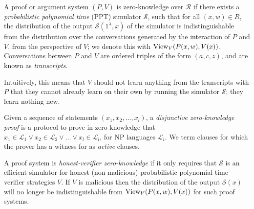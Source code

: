 \begin{definition}
A proof or argument system $(P,V)$ is zero-knowledge over $\mathcal R$ if there exists a \textit{probabilistic polynomial time} (PPT) simulator $\mathcal S$, such that for all $(x,w) \in R$, the distribution of the output $\mathcal S(1^\lambda, x)$ of the simulator is indistinguishable from the distribution over the conversations generated by the interaction of $P$ and $V$, from the perspective of $V$; we denote this with $\text{View}_V(P(x,w),V(x))$. Conversations between $P$ and $V$ are ordered triples of the form $(a,c,z)$, and are known as \textit{transcripts}.
\end{definition}

Intuitively, this means that $V$ should not learn anything from the transcripts  with $P$ that they cannot already learn on their own by running the simulator $\mathcal S$; they learn nothing new.

\begin{definition}
Given a sequence of statements $(x_1,x_2,\ldots, x_l)$, a \textit{disjunctive zero-knowledge proof} is a protocol to prove in zero-knowledge that $x_1 \in \mathcal L_1 \lor x_2 \in \mathcal L_2 \lor \ldots \lor x_l \in \mathcal L_l$, for NP languages $\mathcal L_i$. We term clauses for which the prover has a witness for as \textit{active} clauses. 
\end{definition}

\begin{definition}
A proof system is \textit{honest-verifier zero-knowledge} if it only requires that $\mathcal S$ is an efficient simulator for honest (non-malicious) probabilistic polynomial time verifier strategies $V$. If $V$ is malicious then the distribution of the output $\mathcal S(x)$ will no longer be indistinguishable from $\text{View}_V(P(x,w),V(x))$ for such proof systems. 
\end{definition}

